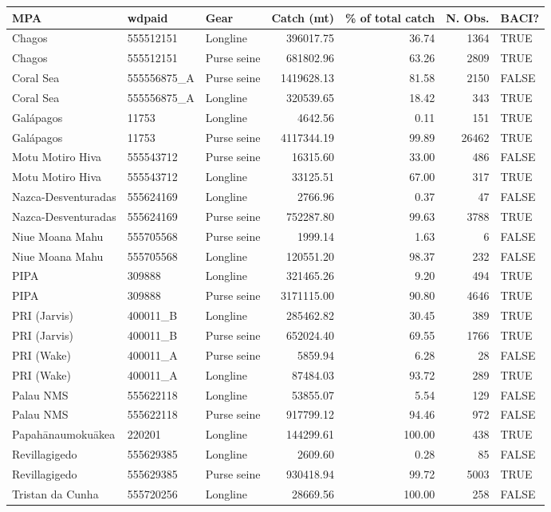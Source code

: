 \begin{table}
\centering
\begin{tabular}{lllrrrl}
\toprule
MPA & wdpaid & Gear & Catch (mt) & \% of total catch & N. Obs. & BACI?\\
\midrule
Chagos & 555512151 & Longline & 396017.75 & 36.74 & 1364 & TRUE\\
Chagos & 555512151 & Purse seine & 681802.96 & 63.26 & 2809 & TRUE\\
Coral Sea & 555556875\_A & Purse seine & 1419628.13 & 81.58 & 2150 & FALSE\\
Coral Sea & 555556875\_A & Longline & 320539.65 & 18.42 & 343 & TRUE\\
Galápagos & 11753 & Longline & 4642.56 & 0.11 & 151 & TRUE\\
\addlinespace
Galápagos & 11753 & Purse seine & 4117344.19 & 99.89 & 26462 & TRUE\\
Motu Motiro Hiva & 555543712 & Purse seine & 16315.60 & 33.00 & 486 & FALSE\\
Motu Motiro Hiva & 555543712 & Longline & 33125.51 & 67.00 & 317 & TRUE\\
Nazca-Desventuradas & 555624169 & Longline & 2766.96 & 0.37 & 47 & FALSE\\
Nazca-Desventuradas & 555624169 & Purse seine & 752287.80 & 99.63 & 3788 & TRUE\\
\addlinespace
Niue Moana Mahu & 555705568 & Purse seine & 1999.14 & 1.63 & 6 & FALSE\\
Niue Moana Mahu & 555705568 & Longline & 120551.20 & 98.37 & 232 & FALSE\\
PIPA & 309888 & Longline & 321465.26 & 9.20 & 494 & TRUE\\
PIPA & 309888 & Purse seine & 3171115.00 & 90.80 & 4646 & TRUE\\
PRI (Jarvis) & 400011\_B & Longline & 285462.82 & 30.45 & 389 & TRUE\\
\addlinespace
PRI (Jarvis) & 400011\_B & Purse seine & 652024.40 & 69.55 & 1766 & TRUE\\
PRI (Wake) & 400011\_A & Purse seine & 5859.94 & 6.28 & 28 & FALSE\\
PRI (Wake) & 400011\_A & Longline & 87484.03 & 93.72 & 289 & TRUE\\
Palau NMS & 555622118 & Longline & 53855.07 & 5.54 & 129 & FALSE\\
Palau NMS & 555622118 & Purse seine & 917799.12 & 94.46 & 972 & FALSE\\
\addlinespace
Papahānaumokuākea & 220201 & Longline & 144299.61 & 100.00 & 438 & TRUE\\
Revillagigedo & 555629385 & Longline & 2609.60 & 0.28 & 85 & FALSE\\
Revillagigedo & 555629385 & Purse seine & 930418.94 & 99.72 & 5003 & TRUE\\
Tristan da Cunha & 555720256 & Longline & 28669.56 & 100.00 & 258 & FALSE\\
\bottomrule
\end{tabular}
\end{table}
